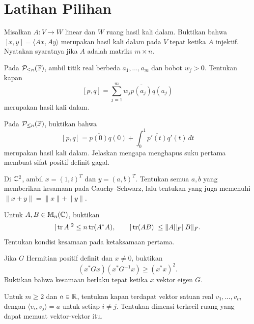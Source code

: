 \section{Latihan Pilihan}

\begin{latihan}\label{hkd:lat-tarik-balik}
    Misalkan $A:V\to W$ linear dan $W$ ruang hasil kali dalam.
    Buktikan bahwa $[x,y]=\langle Ax,Ay\rangle$ merupakan hasil
    kali dalam pada $V$ tepat ketika $A$ injektif.
    Nyatakan syaratnya jika $A$ adalah matriks $m\times n$.
\end{latihan}

\begin{latihan}\label{hkd:lat-evaluasi}
    Pada $\mathcal P_{\le n}(\mathbb{F})$, ambil titik real berbeda
    $a_1,\ldots,a_m$ dan bobot $w_j>0$. Tentukan kapan
    \[
        [p,q]=\sum_{j=1}^m w_j\overline{p(a_j)}q(a_j)
    \]
    merupakan hasil kali dalam.
\end{latihan}

\begin{latihan}\label{hkd:lat-turunan}
    Pada $\mathcal P_{\le n}(\mathbb{F})$, buktikan bahwa
    \[
        [p,q]=\overline{p(0)}q(0)+\int_0^1\overline{p'(t)}q'(t)\,dt
    \]
    merupakan hasil kali dalam. Jelaskan mengapa menghapus
    suku pertama membuat sifat positif definit gagal.
\end{latihan}

\begin{latihan}\label{hkd:lat-kesamaan}
    Di $\mathbb{C}^2$, ambil $x=(1,i)^T$ dan $y=(a,b)^T$.
    Tentukan semua $a,b$ yang memberikan kesamaan pada
    Cauchy--Schwarz, lalu tentukan yang juga memenuhi
    $\|x+y\|=\|x\|+\|y\|$.
\end{latihan}

\begin{latihan}\label{hkd:lat-trace}
    Untuk $A,B\in\mathbb{M}_n(\mathbb{C})$, buktikan
    \[
        |\operatorname{tr} A|^2\le n\operatorname{tr}(A^*A),\qquad
        |\operatorname{tr}(AB)|\le\|A\|_F\|B\|_F.
    \]
    Tentukan kondisi kesamaan pada ketaksamaan pertama.
\end{latihan}

\begin{latihan}\label{hkd:lat-invers-positif}
    Jika $G$ Hermitian positif definit dan $x\ne0$, buktikan
    \[
        (x^*Gx)(x^*G^{-1}x)\ge(x^*x)^2.
    \]
    Buktikan bahwa kesamaan berlaku tepat ketika $x$ vektor eigen $G$.
\end{latihan}

\begin{latihan}\label{hkd:lat-korelasi}
    Untuk $m\ge2$ dan $a\in\mathbb{R}$, tentukan kapan terdapat
    vektor satuan real $v_1,\ldots,v_m$ dengan
    $\langle v_i,v_j\rangle=a$ untuk setiap $i\ne j$.
    Tentukan dimensi terkecil ruang yang dapat memuat vektor-vektor itu.
\end{latihan}

